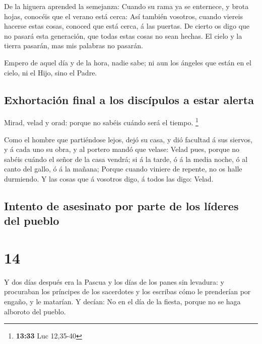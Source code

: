  De la higuera aprended la semejanza: Cuando su rama ya
se enternece, y brota hojas, conocéis que el verano está cerca:
 Así también vosotros, cuando viereis hacerse estas
cosas, conoced que está cerca, á las puertas.  De cierto
os digo que no pasará esta generación, que todas estas cosas no sean
hechas.  El cielo y la tierra pasarán, mas mis palabras
no pasarán.

 Empero de aquel día y de la hora, nadie sabe; ni aun los
ángeles que están en el cielo, ni el Hijo, sino el Padre.

\hypertarget{exhortaciuxf3n-final-a-los-discuxedpulos-a-estar-alerta}{%
\subsection{Exhortación final a los discípulos a estar
alerta}\label{exhortaciuxf3n-final-a-los-discuxedpulos-a-estar-alerta}}

 Mirad, velad y orad: porque no sabéis cuándo será el
tiempo. \footnote{\textbf{13:33} Luc 12,35-40}

 Como el hombre que partiéndose lejos, dejó su casa, y
dió facultad á sus siervos, y á cada uno su obra, y al portero mandó que
velase:  Velad pues, porque no sabéis cuándo el señor de
la casa vendrá; si á la tarde, ó á la media noche, ó al canto del gallo,
ó á la mañana;  Porque cuando viniere de repente, no os
halle durmiendo.  Y las cosas que á vosotros digo, á
todos las digo: Velad.

\hypertarget{intento-de-asesinato-por-parte-de-los-luxedderes-del-pueblo}{%
\subsection{Intento de asesinato por parte de los líderes del
pueblo}\label{intento-de-asesinato-por-parte-de-los-luxedderes-del-pueblo}}

\hypertarget{section-13}{%
\section{14}\label{section-13}}

 Y dos días después era la Pascua y los días de los panes
sin levadura: y procuraban los príncipes de los sacerdotes y los
escribas cómo le prenderían por engaño, y le matarían.  Y
decían: No en el día de la fiesta, porque no se haga alboroto del
pueblo.

